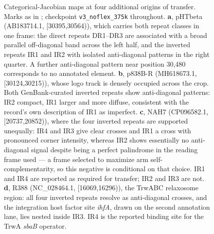 \begin{figure}[h]
    \centering
\caption{
Categorical-Jacobian maps at four additional origins of transfer. Marks as in ; checkpoint \texttt{v3\_noflex\_375k} throughout. \textbf{a}, pHTbeta (AB183714.1, [30395,30564)), which carries both repeat classes in one frame: the direct repeats DR1--DR3 are associated with a broad parallel off-diagonal band across the left half, and the inverted repeats IR1 and IR2 with isolated anti-diagonal patterns in the right quarter. A further anti-diagonal pattern near position 30,480 corresponds to no annotated element. \textbf{b}, p838B-R (MH618673.1, [30124,30215)), whose logo track is densely occupied across the crop. Both GenBank-curated inverted repeats show anti-diagonal patterns: IR2 compact, IR1 larger and more diffuse, consistent with the record's own description of IR1 as imperfect. \textbf{c}, NAH7 (CP096582.1, [20737,20852)), where the four inverted repeats are supported unequally: IR4 and IR3 give clear crosses and IR1 a cross with pronounced corner intensity, whereas IR2 shows essentially no anti-diagonal signal despite being a perfect palindrome in the reading frame used --- a frame selected to maximize arm self-complementarity, so this negative is conditional on that choice. IR1 and IR4 are reported as required for transfer; IR2 and IR3 are not. \textbf{d}, R388 (NC\_028464.1, [16069,16296)), the TrwABC relaxosome region: all four inverted repeats resolve as anti-diagonal crosses, and the integration host factor site \emph{ihfA}, drawn on the second annotation lane, lies nested inside IR3. IR4 is the reported binding site for the TrwA \emph{sbaB} operator.
}
\label{fig:supp-orit-maps}
\end{figure}

